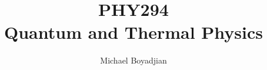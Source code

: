 \documentclass[11pt]{article}
\begin{document}
\title{PHY294 \\ Quantum and Thermal Physics}
\author{Michael Boyadjian}
\maketitle
\pagebreak

\tableofcontents

\pagebreak

\bigskip
\bigskip
\bigskip
\end{document}

